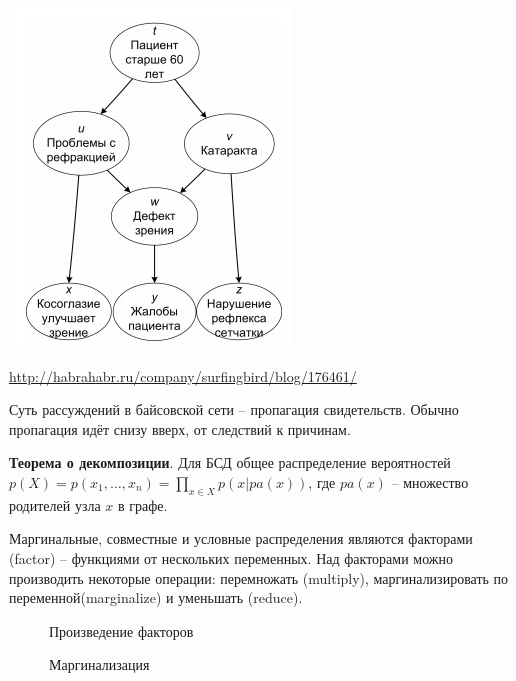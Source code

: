 \documentclass[a4paper,12pt]{article}
\begin{document}
\includegraphics{network}

\url{http://habrahabr.ru/company/surfingbird/blog/176461/}

Суть рассуждений в байсовской сети -- пропагация свидетельств. Обычно пропагация идёт снизу вверх, от следствий к причинам.

\textbf{Теорема о декомпозиции}. Для БСД общее распределение вероятностей $p(X)=p(x_1,\dots,x_n)=\prod\limits_{x\in X}p(x|pa(x))$, где $pa(x)$ -- множество родителей узла $x$ в графе.  

Маргинальные, совместные и условные распределения являются факторами (factor) -- функциями от нескольких переменных. 
Над факторами можно производить некоторые операции: перемножать (multiply), маргинализировать по переменной(marginalize) и уменьшать (reduce). 

\begin{figure}[h!]
    \caption{Произведение факторов}
\end{figure}

\begin{figure}[h!]
    \caption{Маргинализация}
\end{figure}
\end{document}
